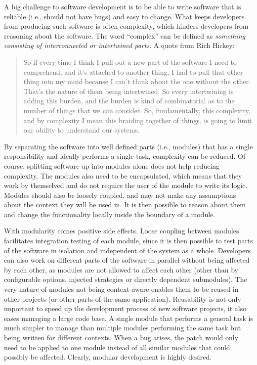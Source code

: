 \documentclass[a4paper,11pt]{kth-mag}
\begin{document}
        A big challenge to software development is to be able to write software that is reliable (i.e., should not have bugs) and easy to change.
        What keeps developers from producing such software is often complexity, which hinders developers from reasoning about the software.
        The word ``complex'' can be defined as \emph{something consisting of interconnected or intertwined parts}.
        A quote from Rich Hickey:
        \begin{quote}
          So if every time I think I pull out a new part of the software I need to comprehend, and it's attached to another thing, I had to pull that other thing into my mind because I can't think about the one without the other.
          That's the nature of them being intertwined. So every intertwining is adding this burden, and the burden is kind of combinatorial as to the number of things that we can consider.
          So, fundamentally, this complexity, and by complexity I mean this braiding together of things, is going to limit our ability to understand our systems.
        \end{quote}
        By separating the software into well defined parts (i.e., modules) that has a single responsibility and ideally performs a single task, complexity can be reduced.
        Of course, splitting software up into modules alone does not help reducing complexity.
        The modules also need to be \gls{encapsulated}, which means that they work by themselved and do not require the user of the module to write its logic.
        Modules should also be loosely coupled, and may not make any assumptions about the context they will be used in.
        It is then possible to reason about them and change the functionality locally inside the boundary of a module.
        
        With modularity comes positive side effects.
        Loose coupling between modules facilitates integration testing of each module, since it is then possible to test parts of the software in isolation and independent of the system as a whole.
        Developers can also work on different parts of the software in parallel without being affected by each other, as modules are not allowed to affect each other (other than by configurable options, injected strategies or directly dependent submodules).
        The very nature of modules not being context-aware enables them to be reused in other projects (or other parts of the same application).
        Reusability is not only important to speed up the development process of new software projects, it also eases managing a large code base.
        A single module that performs a general task is much simpler to manage than multiple modules performing the same task but being written for different contexts.
        When a bug arises, the patch would only need to be applied to one module instead of all similar modules that could possibly be affected.
        Clearly, modular development is highly desired.
\end{document}
